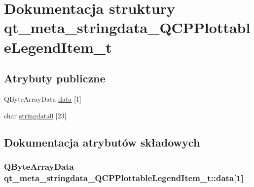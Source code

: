 \hypertarget{structqt__meta__stringdata___q_c_p_plottable_legend_item__t}{}\section{Dokumentacja struktury qt\+\_\+meta\+\_\+stringdata\+\_\+\+Q\+C\+P\+Plottable\+Legend\+Item\+\_\+t}
\label{structqt__meta__stringdata___q_c_p_plottable_legend_item__t}
\subsection*{Atrybuty publiczne}
\begin{DoxyCompactItemize}
\item 
Q\+Byte\+Array\+Data \hyperlink{structqt__meta__stringdata___q_c_p_plottable_legend_item__t_a56d928faacdea012d9b501b879ef98a8}{data} \mbox{[}1\mbox{]}
\item 
char \hyperlink{structqt__meta__stringdata___q_c_p_plottable_legend_item__t_a2add548f134b64b363d6ee1b2125da1d}{stringdata0} \mbox{[}23\mbox{]}
\end{DoxyCompactItemize}


\subsection{Dokumentacja atrybutów składowych}
\subsubsection[{\texorpdfstring{data}{data}}]{\setlength{\rightskip}{0pt plus 5cm}Q\+Byte\+Array\+Data qt\+\_\+meta\+\_\+stringdata\+\_\+\+Q\+C\+P\+Plottable\+Legend\+Item\+\_\+t\+::data\mbox{[}1\mbox{]}}\hypertarget{structqt__meta__stringdata___q_c_p_plottable_legend_item__t_a56d928faacdea012d9b501b879ef98a8}{}\label{structqt__meta__stringdata___q_c_p_plottable_legend_item__t_a56d928faacdea012d9b501b879ef98a8}
